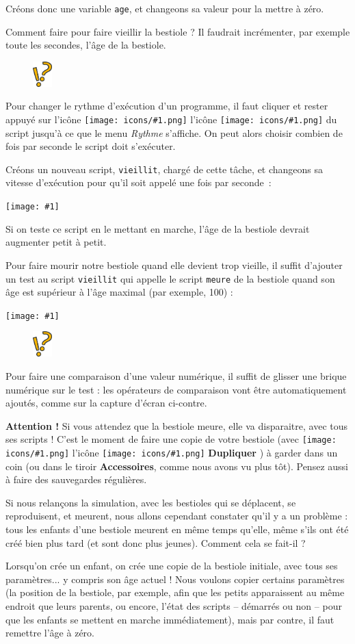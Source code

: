 \documentclass[a4paper,12pt]{book}
\newcommand{\capture}[1]
{
\begin{center}
	\texttt{[image: \#1]}
\end{center}
}
\newcommand{\code}[1]{\texttt{#1}}
\newcommand{\important}[1]{\textbf{#1}}
\newcommand{\inserticon}[1]
{
\texttt{[image: icons/\#1.png]}
}
\newcommand{\icon}[2][]
{
\ifthenelse {\equal{#1} {}} {\inserticon{#2}} {l'icône \inserticon{#2} \important{#1}}
}
\newcommand{\afaire}[1]
{
#1
}
\newcommand{\astuce}[1]
{
\begin{framed}
\begin{figure}
	\vspace{-15pt}
	\includegraphics[width=2.0em]{astuce.png}
\end{figure}
#1
\end{framed}
}
\let\myMargin\marginpar
\renewcommand{\marginpar}[1]{\myMargin{{\scriptsize \sffamily #1}}}
\begin{document}
\afaire { Créons donc une variable \code{age}, et changeons sa valeur pour la
mettre à zéro.

Comment faire pour faire \og vieillir \fg la bestiole ? Il faudrait
incrémenter, par exemple toute les secondes, l'âge de la bestiole.

\astuce{Pour changer le rythme d'exécution d'un programme, il faut cliquer et
rester appuyé sur l'icône \icon{horlogestop} du script jusqu'à ce que le menu
\textit{Rythme} s'affiche. On peut alors choisir combien de fois par seconde le
script doit s'exécuter.} Créons un nouveau script, \code{vieillit}, chargé de
cette tâche, et changeons sa vitesse d'exécution pour qu'il soit appelé une
fois par seconde~:

\capture{44.png}

Si on teste ce script en le mettant en marche, l'âge de la bestiole devrait
augmenter petit à petit.

Pour faire mourir notre bestiole quand elle devient trop vieille, il suffit
d'ajouter un test au script \code{vieillit} qui appelle le script \code{meure}
de la bestiole quand son âge est supérieur à l'âge maximal (par exemple, 100) :

\capture{45.png}

\astuce{Pour faire une comparaison d'une valeur numérique, il suffit de glisser
une brique numérique sur le test : les opérateurs de comparaison vont être
automatiquement ajoutés, comme sur la capture d'écran ci-contre.}

}

\important{Attention !} Si vous attendez que la bestiole meure, elle va
disparaitre, avec tous ses scripts ! C'est le moment de faire une copie de
votre bestiole (avec \icon[Dupliquer]{dupliquer}) à garder dans un coin (ou
dans le tiroir \important{Accessoires}, comme nous avons vu plus tôt). Pensez
aussi à faire des sauvegardes régulières.

Si nous relançons la simulation, avec les bestioles qui se déplacent, se
reproduisent, et meurent, nous allons cependant constater qu'il y a un problème
: tous les enfants d'une bestiole meurent en même temps qu'elle, même s'ils ont
été créé bien plus tard (et sont donc plus jeunes). Comment cela se fait-il ?

Lorsqu'on crée un enfant, on crée une copie de la bestiole initiale, avec tous
ses paramètres... y compris son âge actuel ! Nous voulons copier certains
paramètres (la position de la bestiole, par exemple, afin que les petits
apparaissent au même endroit que leurs parents, ou encore, l'état des scripts
-- démarrés ou non -- pour que les enfants se mettent en marche immédiatement),
mais par contre, il faut remettre l'âge à zéro.
\end{document}
